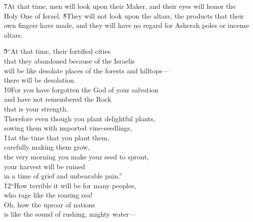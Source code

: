 \v{7}At that time, men will look upon their Maker, and their eyes will honor the Holy One of Israel. \v{8}They will not look upon the altars, the products that their own fingers have made, and they will have no regard for Asherah poles or incense altars.

\begin{poetry}
\poeml \v{9}``At that time, their fortified cities \\
\poemll    that they abandoned because of the Israelis \\
\poeml will be like desolate places of the forests and hilltops--- \\
\poemll    there will be desolation. \\
\poeml \v{10}For you have forgotten the God of your salvation \\
\poemll    and have not remembered the Rock \\
\poemlll       that is your strength. \\
\poeml Therefore even though you plant delightful plants, \\
\poemll    sowing them with imported vine-seedlings, \\
\poeml \v{11}at the time that you plant them, \\
\poemll    carefully making them grow, \\
\poeml the very morning you make your seed to sprout, \\
\poemll    your harvest will be ruined \\
\poemlll       in a time of grief and unbearable pain.'' \\
\poeml \v{12}``How terrible it will be for many peoples, \\
\poemll    who rage like the roaring sea! \\
\poeml Oh, how the uproar of nations \\
\poemll    is like the sound of rushing, mighty water--- \\

\end{poetry}
